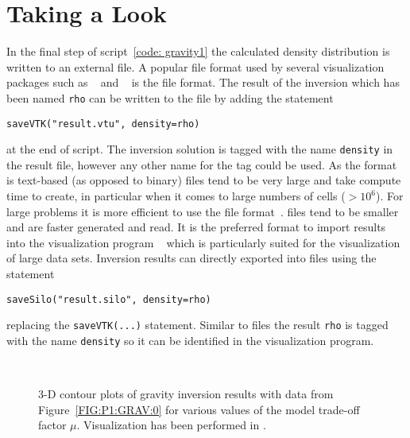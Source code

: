 \section{Taking a Look}
In the final step of script~\ref{code: gravity1} the calculated density
distribution is written to an external file.
A popular file format used by several visualization packages such as
\VisIt~\cite{VISIT} and \mayavi~\cite{MAYAVI} is the \VTK file format.
The result of the inversion which has been named \verb|rho| can be written to
the file  by adding the statement
\begin{verbatim}
saveVTK("result.vtu", density=rho)
\end{verbatim}
at the end of script.
The inversion solution is tagged with the name \verb|density| in the result
file, however any other name for the tag could be used.
As the format is text-based (as opposed to binary) \VTK files tend to be very
large and take compute time to create, in particular when it comes to large
numbers of cells ($>10^6$).
For large problems it is more efficient to use the \SILO file format~\cite{SILO}.
\SILO files tend to be smaller and are faster generated and read.
It is the preferred format to import results into the visualization program
\VisIt~\cite{VISIT} which is particularly suited for the visualization of
large data sets.
Inversion results can directly exported into \SILO files using the statement
\begin{verbatim}
saveSilo("result.silo", density=rho)
\end{verbatim}
replacing the \verb|saveVTK(...)| statement.
Similar to \VTK files the result \verb|rho| is tagged with the name
\verb|density| so it can be identified in the visualization program.

\begin{figure}
    \begin{center}
        \\ %
    \end{center}
    \caption{3-D contour plots of gravity inversion results with data from
    Figure~\ref{FIG:P1:GRAV:0} for various values of the model trade-off
    factor $\mu$. Visualization has been performed in \VisIt.
    }
    \label{FIG:P1:GRAV:10}
\end{figure}

